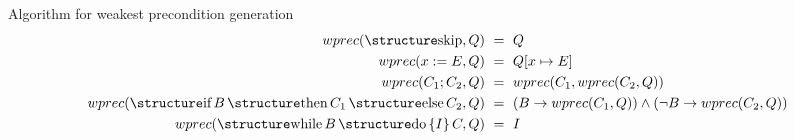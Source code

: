 \documentclass[aspectratio=169]{beamer}
\begin{document}
%
%
%

\begin{slide}{Algorithm for weakest precondition generation}
  \begin{align*}
  wprec(\kw{skip},Q) & ~=~ Q\\
  wprec(x := E,Q)    & ~=~Q[x \mapsto E]\\
  wprec(C_1;C_2,Q)   & ~=~ wprec(C_1,wprec(C_2,Q))\\
  wprec(\kw{if}\,B\,\kw{then}\,C_1\,\kw{else}\,C_2,Q) & ~=~ (B \to wprec(C_1,Q)) \land (\neg B \to wprec(C_2,Q))\\
  wprec(\kw{while}\,B\,\kw{do}\,\{I\}\,C,Q) & ~=~ I
\end{align*}
\end{slide}
\end{document}
